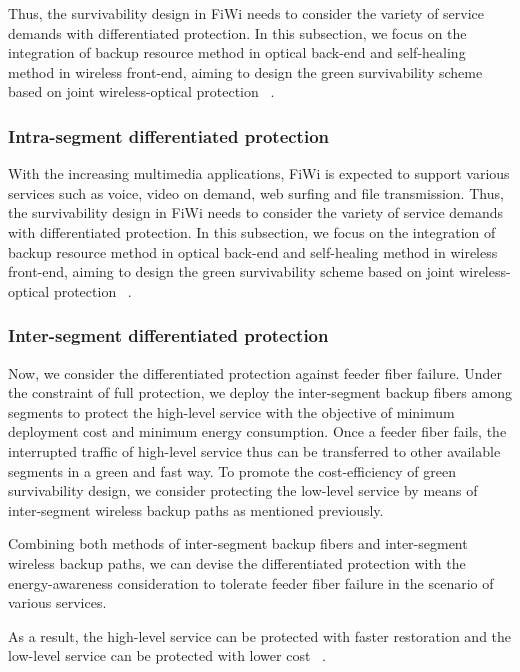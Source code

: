 \documentclass[conference,compsoc]{IEEEtran}
\begin{document}
Thus, the survivability design in FiWi needs to consider the variety of service demands with 
differentiated protection. In this subsection, we focus on the integration of backup resource 
method in optical back-end and self-healing method in wireless front-end, aiming to design the green 
survivability scheme based on joint  wireless-optical protection ~\cite{Liu201268}.


\subsubsection{Intra-segment differentiated protection}
With the increasing multimedia applications, FiWi is expected to support various services such as 
	voice, video on demand, web surfing and file transmission. Thus, the survivability design in FiWi
needs to consider the variety of service demands with differentiated protection. In this subsection, 
we focus on the integration of backup resource method in optical back-end and self-healing method in 
wireless front-end, aiming to design the green survivability scheme based on joint wireless-optical 
protection ~\cite{Liu201268}.




\subsubsection{Inter-segment differentiated protection}

Now, we consider the differentiated protection against feeder fiber failure. Under the constraint of 
full protection, we deploy the inter-segment backup fibers among segments to protect the high-level 
service with the objective of minimum deployment cost and minimum energy consumption. Once a feeder 
fiber fails, the interrupted traffic of high-level service thus can be transferred to other 
available segments in a green and fast way. To promote the cost-efficiency of green survivability 
design, we consider protecting the low-level service by means of inter-segment wireless backup paths 
as mentioned previously.


Combining both methods of inter-segment backup fibers and inter-segment wireless backup paths, we 
can devise the differentiated protection with the energy-awareness consideration to tolerate feeder 
fiber failure in the scenario of various services. 

As a result, the high-level service can be protected with faster restoration and the low-level 
service can be protected with lower cost ~\cite{Liu201268}.
\end{document}
